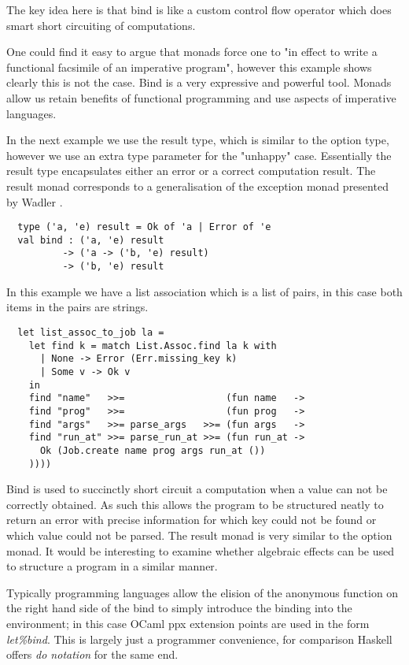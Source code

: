The key idea here is that bind is like a custom control
flow operator which does smart short circuiting of
computations.

One could find it easy to argue that monads force one to
"in effect to write a functional facsimile of an imperative program",
however this example shows clearly this is not the case.
Bind is a very expressive and powerful tool.
Monads allow us retain benefits of functional programming
and use aspects of imperative languages\cite{PeytonJones:1993}.

In the next example we use the result type,
which is similar to the option type, however we use an extra type
parameter for the "unhappy" case. Essentially the result type encapsulates
either an error or a correct computation result. The result monad
corresponds to a generalisation of the exception monad presented by Wadler \cite{wadler1995monads}.

\begin{verbatim}
  type ('a, 'e) result = Ok of 'a | Error of 'e
  val bind : ('a, 'e) result
          -> ('a -> ('b, 'e) result)
          -> ('b, 'e) result
\end{verbatim}

In this example we have a list association which is a list of pairs,
in this case both items in the pairs are strings.

\begin{verbatim}
  let list_assoc_to_job la =
    let find k = match List.Assoc.find la k with
      | None -> Error (Err.missing_key k)
      | Some v -> Ok v
    in
    find "name"   >>=                  (fun name   ->
    find "prog"   >>=                  (fun prog   ->
    find "args"   >>= parse_args   >>= (fun args   ->
    find "run_at" >>= parse_run_at >>= (fun run_at ->
      Ok (Job.create name prog args run_at ())
    ))))
\end{verbatim}

Bind is used to succinctly short circuit a computation when a value can not be
correctly obtained. As such this allows the program to be structured neatly to return
an error with precise information for which key could not be found or which value could
not be parsed. The result monad is very similar to the option monad. It would be interesting
to examine whether algebraic effects can be used to structure a program in a similar manner.

Typically programming languages allow the elision of the anonymous function on the right hand side
of the bind to simply introduce the binding into the environment;
in this case OCaml ppx extension points are used in the form \textit{let\%bind}.
This is largely just a programmer convenience,
for comparison Haskell offers \textit{do notation} for the same end.

